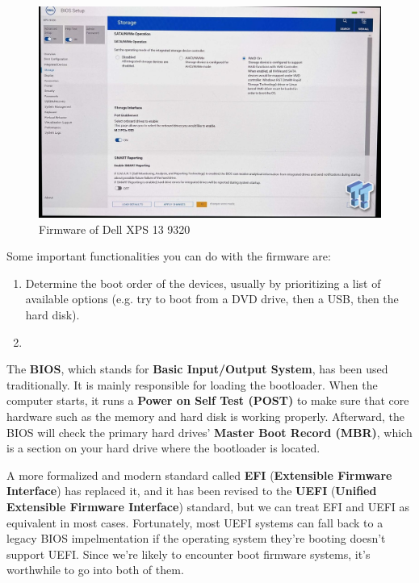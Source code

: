 \documentclass{article}
\begin{document}
    \begin{figure}[hbt!]
      \centering 
      \includegraphics[scale=0.3]{img/xps_firmware.jpg}
      \caption{Firmware of Dell XPS 13 9320} 
      \label{fig:xps_firmware}
    \end{figure}

    Some important functionalities you can do with the firmware are: 
    \begin{enumerate} 
      \item Determine the boot order of the devices, usually by prioritizing a list of available options (e.g. try to boot from a DVD drive, then a USB, then the hard disk). 
      \item 
    \end{enumerate}

    The \textbf{BIOS}, which stands for \textbf{Basic Input/Output System}, has been used traditionally. It is mainly responsible for loading the bootloader. When the computer starts, it runs a \textbf{Power on Self Test (POST)} to make sure that core hardware such as the memory and hard disk is working properly. Afterward, the BIOS will check the primary hard drives' \textbf{Master Boot Record (MBR)}, which is a section on your hard drive where the bootloader is located. 

    A more formalized and modern standard called \textbf{EFI} (\textbf{Extensible Firmware Interface}) has replaced it, and it has been revised to the \textbf{UEFI} (\textbf{Unified Extensible Firmware Interface}) standard, but we can treat EFI and UEFI as equivalent in most cases. Fortunately, most UEFI systems can fall back to a legacy BIOS impelmentation if the operating system they're booting doesn't support UEFI. Since we're likely to encounter boot firmware systems, it's worthwhile to go into both of them. 
\end{document}
